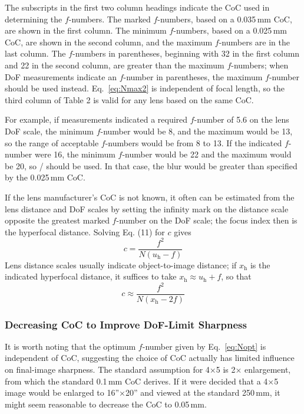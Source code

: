 \documentclass[11pt, oneside]{scrartcl}   	%
\newcommand{\f}[1]{\mbox{\raisebox{2pt}{\footnotesize $f$\hspace{-1.2pt}}/\hspace{-0.6pt}\raisebox{-0.6pt}{\small #1}}}
\begin{document}
The subscripts in the first two column headings indicate the CoC used in determining the $f$-numbers. The marked $f$-numbers, based on a 0.035\,mm CoC, are shown in the first column. The minimum $f$-numbers, based on a 0.025\,mm CoC, are shown in the second column, and the maximum $f$-numbers are in the last column. The $f$-numbers in parentheses, beginning with 32 in the first column and 22 in the second column, are greater than the maximum $f$-numbers; when DoF measurements indicate an $f$-number in parentheses, the maximum $f$-number should be used instead. Eq.~\ref{eq:Nmax2} is independent of focal length, so the third column of Table 2 is valid for any lens based on the same CoC.

For example, if measurements indicated a required $f$-number of 5.6 on the lens DoF scale, the minimum $f$-number would be 8, and the maximum would be 13, so the range of acceptable $f$-numbers would be from 8 to 13. If the indicated $f$-number were 16, the minimum $f$-number would be 22 and the maximum would be 20, so \f{20} should be used. In that case, the blur would be greater than specified by the 0.025\,mm CoC.

If the lens manufacturer’s CoC is not known, it often can be estimated from the lens distance and DoF scales by setting the infinity mark on the distance scale opposite the greatest marked $f$-number on the DoF scale; the focus index then is the hyperfocal distance. Solving Eq. (11) for $c$ gives
\begin{equation}
c=\frac{f^2}{N(u_\mathrm{h}-f)}
\end{equation}
Lens distance scales usually indicate object-to-image distance; if $x_\mathrm{h}$ is the indicated hyperfocal distance, it suffices to take $x_\mathrm{h} ≈ u_\mathrm{h} + f$, so that
\begin{equation}
c\approx \frac{f^2}{N(x_\mathrm{h}-2f)}
    \label{eq:capprox}
\end{equation}

\subsubsection{Decreasing CoC to Improve DoF-Limit Sharpness}

It is worth noting that the optimum $f$-number given by Eq.~\ref{eq:Nopt} is independent of CoC, suggesting the choice of CoC actually has limited influence on final-image sharpness. The standard assumption for 4×5 is 2× enlargement, from which the standard 0.1\,mm CoC derives. If it were decided that a 4×5 image would be enlarged to 16''×20'' and viewed at the standard 250\,mm, it might seem reasonable to decrease the CoC to 0.05\,mm.
\end{document}
